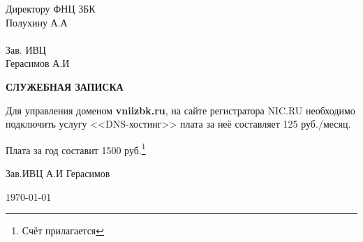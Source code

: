 \documentclass[a4paper,12pt,oneside]{article}
\begin{document}
\hangindent=10cm
\noindent Директору ФНЦ ЗБК\\
Полухину А.А\\ \\
Зав. ИВЦ\\
Герасимов А.И
\vspace{2cm}
\begin{center}
\textbf{СЛУЖЕБНАЯ ЗАПИСКА}
\end{center}

Для управления доменом \textbf{vniizbk.ru}, на сайте регистратора NIC.RU необходимо подключить услугу <<DNS-хостинг>> плата за неё составляет 125 руб./месяц.

Плата за год составит 1500 руб.\footnote{Счёт прилагается}

\begin{center}
\vspace{2cm}
Зав.ИВЦ \hspace*{4cm} А.И Герасимов
\end{center}
\vspace{1cm}
\today
\end{document}
